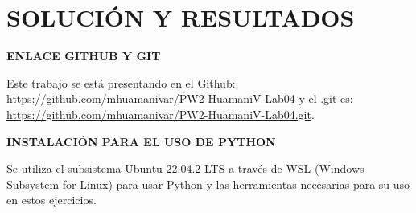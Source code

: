 \documentclass{article}
\begin{document}
\noindent
\section*{\centering SOLUCIÓN Y RESULTADOS}

\vspace{2\baselineskip}

\textbf{ENLACE GITHUB Y GIT}

Este trabajo se está presentando en el Github: \url{https://github.com/mhuamanivar/PW2-HuamaniV-Lab04} y el .git es: \url{https://github.com/mhuamanivar/PW2-HuamaniV-Lab04.git}.

\vspace{2\baselineskip}

\textbf{INSTALACIÓN PARA EL USO DE PYTHON}

Se utiliza el subsistema Ubuntu 22.04.2 LTS a través de WSL (Windows Subsystem for Linux) para usar Python y las herramientas necesarias para su uso en estos ejercicios.

\vspace{2\baselineskip}
\end{document}
